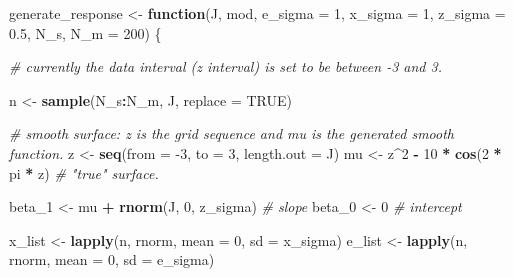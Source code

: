 \documentclass[
]{article}
\newenvironment{Shaded}{\begin{snugshade}}{\end{snugshade}}
\newcommand{\CommentTok}[1]{\textcolor[rgb]{0.56,0.35,0.01}{\textit{#1}}}
\newcommand{\ControlFlowTok}[1]{\textcolor[rgb]{0.13,0.29,0.53}{\textbf{#1}}}
\newcommand{\DataTypeTok}[1]{\textcolor[rgb]{0.13,0.29,0.53}{#1}}
\newcommand{\DecValTok}[1]{\textcolor[rgb]{0.00,0.00,0.81}{#1}}
\newcommand{\FloatTok}[1]{\textcolor[rgb]{0.00,0.00,0.81}{#1}}
\newcommand{\KeywordTok}[1]{\textcolor[rgb]{0.13,0.29,0.53}{\textbf{#1}}}
\newcommand{\NormalTok}[1]{#1}
\newcommand{\OperatorTok}[1]{\textcolor[rgb]{0.81,0.36,0.00}{\textbf{#1}}}
\newcommand{\OtherTok}[1]{\textcolor[rgb]{0.56,0.35,0.01}{#1}}
\newcommand{\StringTok}[1]{\textcolor[rgb]{0.31,0.60,0.02}{#1}}
\begin{document}
\begin{Shaded}
\begin{Highlighting}[]
\NormalTok{generate_response <-}\StringTok{ }\ControlFlowTok{function}\NormalTok{(J, mod, }\DataTypeTok{e_sigma =} \DecValTok{1}\NormalTok{, }\DataTypeTok{x_sigma =} \DecValTok{1}\NormalTok{, }\DataTypeTok{z_sigma =} \FloatTok{0.5}\NormalTok{, N_s, }\DataTypeTok{N_m =} \DecValTok{200}\NormalTok{) \{}

  \CommentTok{# currently the data interval (z interval) is set to be between -3 and 3.}

\NormalTok{  n <-}\StringTok{ }\KeywordTok{sample}\NormalTok{(N_s}\OperatorTok{:}\NormalTok{N_m, J, }\DataTypeTok{replace =} \OtherTok{TRUE}\NormalTok{)}

  \CommentTok{# smooth surface: z is the grid sequence and mu is the generated smooth function.}
\NormalTok{  z <-}\StringTok{ }\KeywordTok{seq}\NormalTok{(}\DataTypeTok{from =} \DecValTok{-3}\NormalTok{, }\DataTypeTok{to =} \DecValTok{3}\NormalTok{, }\DataTypeTok{length.out =}\NormalTok{ J)}
\NormalTok{  mu <-}\StringTok{ }\NormalTok{z}\OperatorTok{^}\DecValTok{2} \OperatorTok{-}\StringTok{ }\DecValTok{10} \OperatorTok{*}\StringTok{ }\KeywordTok{cos}\NormalTok{(}\DecValTok{2} \OperatorTok{*}\StringTok{ }\NormalTok{pi }\OperatorTok{*}\StringTok{ }\NormalTok{z)  }\CommentTok{# "true" surface.}

\NormalTok{  beta_}\DecValTok{1}\NormalTok{ <-}\StringTok{ }\NormalTok{mu }\OperatorTok{+}\StringTok{ }\KeywordTok{rnorm}\NormalTok{(J, }\DecValTok{0}\NormalTok{, z_sigma)  }\CommentTok{# slope}
\NormalTok{  beta_}\DecValTok{0}\NormalTok{ <-}\StringTok{ }\DecValTok{0}  \CommentTok{# intercept}

\NormalTok{  x_list <-}\StringTok{ }\KeywordTok{lapply}\NormalTok{(n, rnorm, }\DataTypeTok{mean =} \DecValTok{0}\NormalTok{, }\DataTypeTok{sd =}\NormalTok{ x_sigma)}
\NormalTok{  e_list <-}\StringTok{ }\KeywordTok{lapply}\NormalTok{(n, rnorm, }\DataTypeTok{mean =} \DecValTok{0}\NormalTok{, }\DataTypeTok{sd =}\NormalTok{ e_sigma)}


\end{Highlighting}
\end{Shaded}
\end{document}
